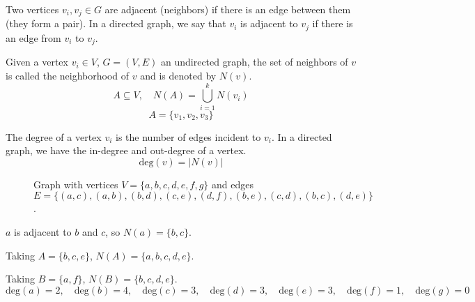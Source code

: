 \documentclass[11pt]{article}
\begin{document}
Two vertices $v_i, v_j \in G$ are adjacent (neighbors) if there is an edge between them (they form a pair). In a directed graph, we say that $v_i$ is adjacent to $v_j$ if there is an edge from $v_i$ to $v_j$.

Given a vertex $v_i \in V$, $G = (V,E)$ an undirected graph, the set of neighbors of $v$ is called the neighborhood of $v$ and is denoted by $N(v)$.
\[
A \subseteq V, \quad N(A) = \bigcup_{i = 1}^k N(v_i)
\]
\[
A = \{v_1, v_2, v_3\}
\]

The degree of a vertex $v_i$ is the number of edges incident to $v_i$. In a directed graph, we have the in-degree and out-degree of a vertex.
\[
\text{deg}(v) = |N(v)|
\]

\begin{center}
    \begin{figure}[H]
        \centering
        \caption{Graph with vertices $V = \{a,b,c,d,e,f,g\}$ and edges \\ $E = \{(a,c), (a,b), (b,d), (c,e), (d,f), (b,e), (c,d), (b,c), (d,e)\}$.}
    \end{figure}
\end{center}

$a$ is adjacent to $b$ and $c$, so $N(a) = \{b,c\}$.

Taking $A = \{b,c,e\}$, $N(A) = \{a,b,c,d,e\}$.

Taking $B = \{a,f\}$, $N(B) = \{b,c,d,e\}$.
\[
\text{deg}(a) = 2, \quad \text{deg}(b) = 4, \quad \text{deg}(c) = 3, \quad \text{deg}(d) = 3, \quad \text{deg}(e) = 3, \quad \text{deg}(f) = 1, \quad \text{deg}(g) = 0
\]
\end{document}
